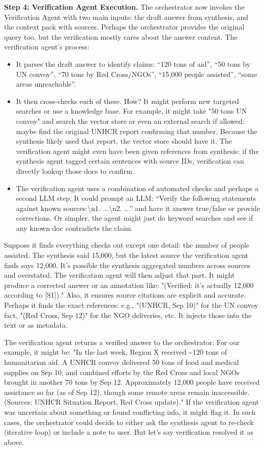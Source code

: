 \textbf{Step 4: Verification Agent Execution.} The orchestrator now invokes the Verification Agent with two main inputs: the draft answer from synthesis, and the context pack with sources. Perhaps the orchestrator provides the original query too, but the verification mostly cares about the answer content. The verification agent's process:
\begin{itemize}
  \item It parses the draft answer to identify claims: “120 tons of aid”, “50 tons by UN convoy”, “70 tons by Red Cross/NGOs”, “15{,}000 people assisted”, “some areas unreachable”.
    \item It then cross-checks each of these. How? It might perform new targeted searches or use a knowledge base. For example, it might take "50 tons UN convoy" and search the vector store or even an external search if allowed: maybe find the original UNHCR report confirming that number. Because the synthesis likely used that report, the vector store should have it. The verification agent might even have been given references from synthesis: if the synthesis agent tagged certain sentences with source IDs, verification can directly lookup those docs to confirm.
  \item The verification agent uses a combination of automated checks and perhaps a second LLM step. It could prompt an LLM: “Verify the following statements against known sources:\textbackslash n1. ...\textbackslash n2. ...” and have it answer true/false or provide corrections. Or simpler, the agent might just do keyword searches and see if any known doc contradicts the claim.
\end{itemize}
Suppose it finds everything checks out except one detail: the number of people assisted. The synthesis said 15{,}000, but the latest source the verification agent finds says 12{,}000. It's possible the synthesis aggregated numbers across sources and overstated. The verification agent will then adjust that part. It might produce a corrected answer or an annotation like: "(Verified: it's actually 12{,}000 according to [S1])." Also, it ensures source citations are explicit and accurate. Perhaps it finds the exact references: e.g., "(UNHCR, Sep 10)" for the UN convoy fact, "(Red Cross, Sep 12)" for the NGO deliveries, etc. It injects those into the text or as metadata.

The verification agent returns a verified answer to the orchestrator. For our example, it might be: "In the last week, Region X received \textasciitilde120 tons of humanitarian aid. A UNHCR convoy delivered 50 tons of food and medical supplies on Sep 10, and combined efforts by the Red Cross and local NGOs brought in another 70 tons by Sep 12. Approximately 12{,}000 people have received assistance so far (as of Sep 12), though some remote areas remain inaccessible. (Sources: UNHCR Situation Report, Red Cross update)." If the verification agent was uncertain about something or found conflicting info, it might flag it. In such cases, the orchestrator could decide to either ask the synthesis agent to re-check (iterative loop) or include a note to user. But let's say verification resolved it as above.

